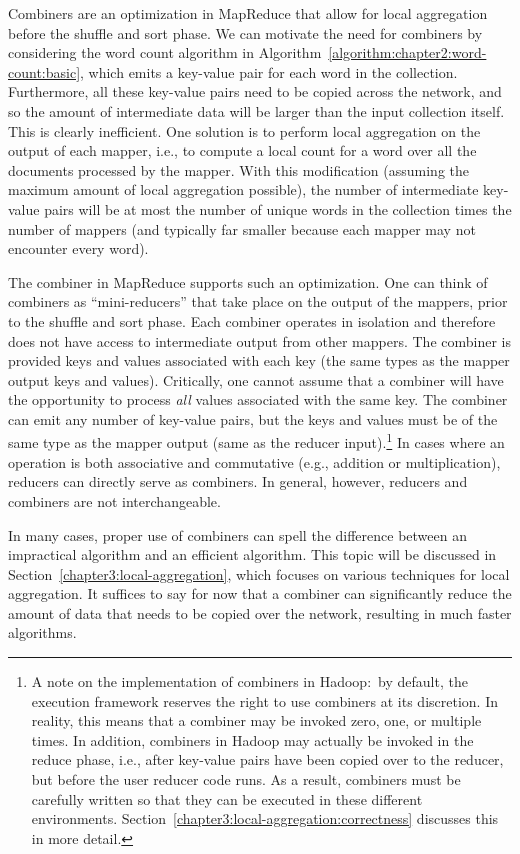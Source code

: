 Combiners are an optimization in MapReduce that allow for local
aggregation before the shuffle and sort phase.  We can motivate the
need for combiners by considering the word count algorithm in
Algorithm~\ref{algorithm:chapter2:word-count:basic}, which emits a key-value pair
for each word in the collection.  Furthermore, all these key-value
pairs need to be copied across the network, and so the amount of
intermediate data will be larger than the input collection itself.
This is clearly inefficient.  One solution is to perform local
aggregation on the output of each mapper, i.e., to compute a local
count for a word over all the documents processed by the mapper.  With
this modification (assuming the maximum amount of local aggregation
possible), the number of intermediate key-value pairs will be at most
the number of unique words in the collection times the number of
mappers (and typically far smaller because each mapper may not
encounter every word).

The combiner in MapReduce supports such an optimization.  One can
think of combiners as ``mini-reducers'' that take place on the output
of the mappers, prior to the shuffle and sort phase.  Each combiner
operates in isolation and therefore does not have access to
intermediate output from other mappers.  The combiner is provided keys
and values associated with each key (the same types as the mapper
output keys and values).  Critically, one cannot assume that a
combiner will have the opportunity to process \emph{all} values
associated with the same key.  The combiner can emit any number of
key-value pairs, but the keys and values must be of the same type as
the mapper output (same as the reducer input).\footnote{A note on the
implementation of combiners in Hadoop:\ by default, the execution
framework reserves the right to use combiners at its discretion.  In
reality, this means that a combiner may be invoked zero, one, or
multiple times.  In addition, combiners in Hadoop may actually be
invoked in the reduce phase, i.e., after key-value pairs have been
copied over to the reducer, but before the user reducer code runs.  As
a result, combiners must be carefully written so that they can be
executed in these different environments.
Section~\ref{chapter3:local-aggregation:correctness} discusses this in
more detail.}  In cases where an operation is both associative and
commutative (e.g., addition or multiplication), reducers can directly
serve as combiners.  In general, however, reducers and combiners are
not interchangeable.

In many cases, proper use of combiners can spell the difference
between an impractical algorithm and an efficient algorithm.  This
topic will be discussed in Section~\ref{chapter3:local-aggregation},
which focuses on various techniques for local aggregation.  It
suffices to say for now that a combiner can significantly reduce the
amount of data that needs to be copied over the network, resulting in
much faster algorithms.


